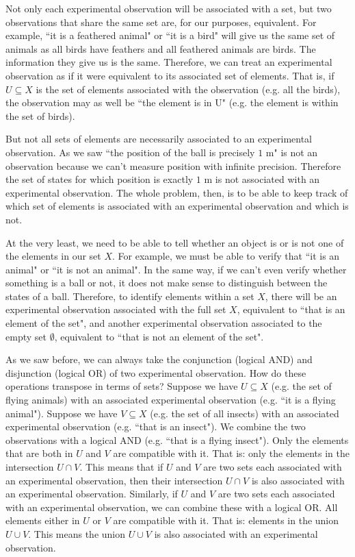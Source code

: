 \documentclass[11pt,letterpaper,fleqn]{memoir} %
\begin{document}
Not only each experimental observation will be associated with a set, but two observations that share the same set are, for our purposes, equivalent. For example, ``it is a feathered animal" or ``it is a bird" will give us the same set of animals as all birds have feathers and all feathered animals are birds. The information they give us is the same. Therefore, we can treat an experimental observation as if it were equivalent to its associated set of elements. That is, if $U \subseteq X$ is the set of elements associated with the observation (e.g. all the birds), the observation may as well be ``the element is in U" (e.g. the element is within the set of birds).

But not all sets of elements are necessarily associated to an experimental observation. As we saw ``the position of the ball is precisely $1$ m" is not an observation because we can't measure position with infinite precision. Therefore the set of states for which position is exactly $1$ m is not associated with an experimental observation. The whole problem, then, is to be able to keep track of which set of elements is associated with an experimental observation and which is not.

At the very least, we need to be able to tell whether an object is or is not one of the elements in our set $X$. For example, we must be able to verify that ``it is an animal" or ``it is not an animal". In the same way, if we can't even verify whether something is a ball or not, it does not make sense to distinguish between the states of a ball. Therefore, to identify elements within a set $X$, there will be an experimental observation associated with the full set $X$, equivalent to ``that is an element of the set", and another experimental observation associated to the empty set $\emptyset$, equivalent to ``that is not an element of the set".

As we saw before, we can always take the conjunction (logical AND) and disjunction (logical OR) of two experimental observation. How do these operations transpose in terms of sets? Suppose we have $U \subseteq X$ (e.g. the set of flying animals) with an associated experimental observation (e.g. ``it is a flying animal"). Suppose we have $V \subseteq X$ (e.g. the set of all insects) with an associated experimental observation (e.g. ``that is an insect"). We combine the two observations with a logical AND (e.g. ``that is a flying insect"). Only the elements that are both in $U$ and $V$ are compatible with it. That is: only the elements in the intersection $U \cap V$. This means that if $U$ and $V$ are two sets each associated with an experimental observation, then their intersection $U \cap V$ is also associated with an experimental observation. Similarly, if $U$ and $V$ are two sets each associated with an experimental observation, we can combine these with a logical OR. All elements either in $U$ or $V$ are compatible with it. That is: elements in the union $U \cup V$. This means the union $U \cup V$ is also associated with an experimental observation.
\end{document}
